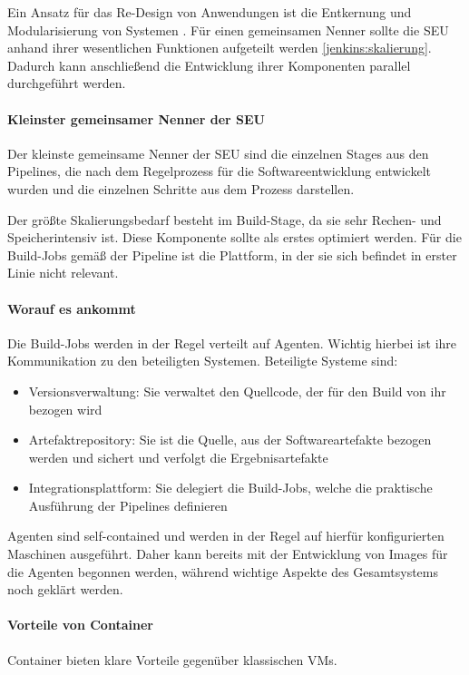 Ein Ansatz für das Re-Design von Anwendungen ist die Entkernung und Modularisierung von Systemen \cite{Bussmann2006}.
Für einen gemeinsamen Nenner sollte die \ac{SEU} anhand ihrer wesentlichen Funktionen aufgeteilt werden \ref{jenkins:skalierung}. Dadurch kann anschließend die Entwicklung ihrer Komponenten parallel durchgeführt werden. 

\paragraph{Kleinster gemeinsamer Nenner der SEU}
Der kleinste gemeinsame Nenner der \ac{SEU} sind die einzelnen Stages aus den Pipelines, die nach dem Regelprozess für die Softwareentwicklung entwickelt wurden und die einzelnen Schritte aus dem Prozess darstellen.

Der größte Skalierungsbedarf besteht im Build-Stage, da sie sehr Rechen- und Speicherintensiv ist. Diese Komponente sollte als erstes optimiert werden.
Für die Build-Jobs gemäß der Pipeline ist die Plattform, in der sie sich befindet in erster Linie nicht relevant. 

\paragraph{Worauf es ankommt}
Die Build-Jobs werden in der Regel verteilt auf Agenten. Wichtig hierbei ist ihre Kommunikation zu den beteiligten Systemen. Beteiligte Systeme sind:
\begin{itemize}
    \item Versionsverwaltung: Sie verwaltet den Quellcode, der für den Build von ihr bezogen wird
    \item Artefaktrepository: Sie ist die Quelle, aus der Softwareartefakte bezogen werden und sichert und verfolgt die Ergebnisartefakte
    \item Integrationsplattform: Sie delegiert die Build-Jobs, welche die praktische Ausführung der Pipelines definieren
\end{itemize}

Agenten sind self-contained und werden in der Regel auf hierfür konfigurierten Maschinen ausgeführt. Daher kann bereits mit der Entwicklung von Images für die Agenten begonnen werden, während wichtige Aspekte des Gesamtsystems noch geklärt werden.

\paragraph{Vorteile von Container}
Container bieten klare Vorteile gegenüber klassischen VMs. 

